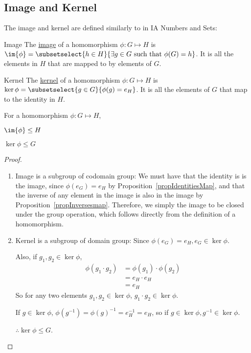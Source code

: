 \documentclass[../Main.tex]{subfiles}
\begin{document}
\subsection{Image and Kernel}
The image and kernel are defined similarly to in IA Numbers and Sets:
\begin{definition}{Image}
    The \underline{image} of a homomorphism $\phi : G \mapsto H$ is $\im{\phi} = \subsetselect{h \in H}{\exists g \in G \text{ such that } \phi(G) = h}$. It is all the elements in $H$ that are mapped to by elements of $G$.
\end{definition}
\begin{definition}{Kernel}
    The \underline{kernel} of a homomorphism $\phi : G \mapsto H$ is $\ker{\phi} = \subsetselect{g \in G}{\phi(g) = e_H}$. It is all the elements of $G$ that map to the identity in $H$.
\end{definition}
\begin{propositions}{
        For a homomorphism $\phi : G \mapsto H$,
    }
    \item $\im{\phi} \leq H$
    \item $\ker{\phi} \leq G$
\end{propositions}
\begin{proof}
    \begin{enumerate}
        \item Image is a subgroup of codomain group:
        We must have that the identity is is the image, since $\phi(e_G) = e_H$ by Proposition~\ref{propIdentitiesMap}, and that the inverse of any element in the image is also in the image by Proposition~\ref{propInversesmap}. Therefore, we simply the image to be closed under the group operation, which follows directly from the definition of a homomorphism.
        \item Kernel is a subgroup of domain group:
        Since $\phi(e_G) = e_H, e_G \in \ker{\phi}$.\par
        Also, if $g_1, g_2 \in \ker{\phi}$,
        \begin{align*}
            \phi(g_1 \cdot g_2) &= \phi(g_1) \cdot \phi(g_2) \\
            &= e_H \cdot e_H \\
            &= e_H
        \end{align*}
        So for any two elements $g_1, g_2 \in \ker{\phi}$, $g_1 \cdot g_2 \in \ker{\phi}$.\par
        If $g \in \ker{\phi}$, $\phi(g^{-1}) = \phi(g)^{-1} = e_H^{-1} = e_H$, so if $g \in \ker{\phi}, g^{-1} \in \ker{\phi}$.\par
        $\therefore \ker{\phi} \leq G$.
    \end{enumerate}
\end{proof}
\end{document}
